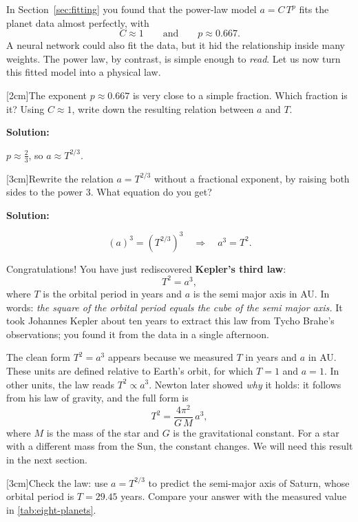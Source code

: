 \documentclass[12pt]{article}
\makeatletter
\newcounter{question}
\newlength\questionheight
\newcommand{\question}{\@ifstar{\question@text}{\question@field}}
\newcommand{\question@heading}[1]{%
  \refstepcounter{question}%
  \vspace{0.3cm}%
  \noindent\textbf{\faEdit\ Question \thequestion: #1}%
}
\newcommand{\question@text}[1]{%
  \question@heading{#1}%
}
\newcommand{\question@field}[2][\questionheight]{%
  \question@heading{#2}%
 \\[0.3em] \begin{Form}
    \TextField[
      name=Q\thequestion,
      multiline=true,
      width=\linewidth,
      height=#1,
      charsize=10pt,
      bordercolor={0 0 0},
      borderwidth=1.8,
      backgroundcolor={1 1 1}
    ]{}
  \end{Form}
  \vspace{0.3cm}%
}
\newenvironment{solution}{%
  \begin{solutionbox}\textbf{Solution:}
}{%
  \end{solutionbox}
}
\makeatother
\begin{document}
In Section~\ref{sec:fitting} you found that the power-law model $a = C\,T^{p}$ fits the planet data almost perfectly, with
$$C \approx 1 \qquad\text{and}\qquad p \approx 0.667.$$
A neural network could also fit the data, but it hid the relationship inside many weights. The power law, by contrast, is simple enough to \emph{read}. Let us now turn this fitted model into a physical law.

\question[2cm]{The exponent $p \approx 0.667$ is very close to a simple fraction. Which fraction is it? Using $C \approx 1$, write down the resulting relation between $a$ and $T$.}

\begin{solution}
$p \approx \tfrac{2}{3}$, so $a \approx T^{2/3}$.
\end{solution}

\question[3cm]{Rewrite the relation $a = T^{2/3}$ without a fractional exponent, by raising both sides to the power $3$. What equation do you get?}

\begin{solution}
$$\left(a\right)^3 = \left(T^{2/3}\right)^3 \quad\Longrightarrow\quad a^3 = T^2.$$
\end{solution}

\begin{importantbox}
Congratulations! You have just rediscovered \textbf{Kepler's third law}:
$$T^2 = a^3,$$
where $T$ is the orbital period in years and $a$ is the semi major axis in AU. In words: \emph{the square of the orbital period equals the cube of the semi major axis.} It took Johannes Kepler about ten years to extract this law from Tycho Brahe's observations; you found it from the data in a single afternoon.
\end{importantbox}

The clean form $T^2 = a^3$ appears because we measured $T$ in years and $a$ in AU. These units are defined relative to Earth's orbit, for which $T = 1$ and $a = 1$. In other units, the law reads $T^2 \propto a^3$. Newton later showed \emph{why} it holds: it follows from his law of gravity, and the full form is
$$T^2 = \frac{4\pi^2}{G\,M}\,a^3,$$
where $M$ is the mass of the star and $G$ is the gravitational constant. For a star with a different mass from the Sun, the constant changes. We will need this result in the next section.

\question[3cm]{Check the law: use $a = T^{2/3}$ to predict the semi-major axis of Saturn, whose orbital period is $T = 29.45$ years. Compare your answer with the measured value in \cref{tab:eight-planets}.}
\end{document}
